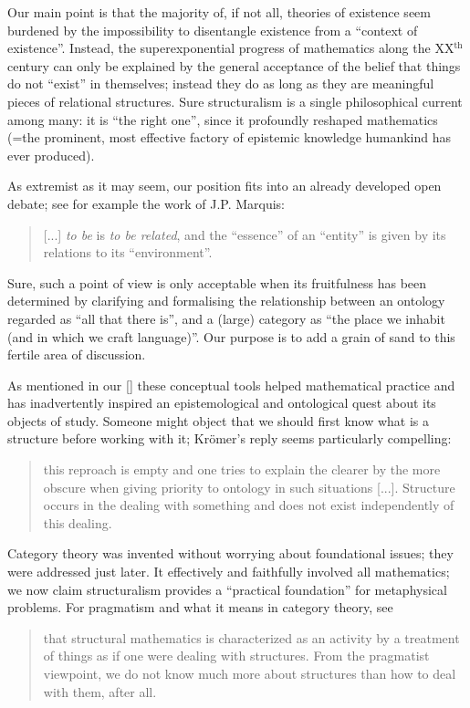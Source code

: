 \begin{itemize}
\end{itemize}
Our main point is that the majority of, if not all, theories of existence seem burdened by the impossibility to disentangle existence from a ``context of existence''. Instead, the superexponential progress of mathematics along the XX$^\text{th}$ century can only be explained by the general acceptance of the belief that things do not ``exist'' in themselves; instead they do as long as they are meaningful pieces of relational structures. Sure structuralism is a single philosophical current among many: it is ``the right one'', since it profoundly reshaped mathematics (=the prominent, most effective factory of epistemic knowledge humankind has ever produced).

As extremist as it may seem, our position fits into an already developed open debate; see for example the work of J.P. Marquis:
\begin{quote}
	[...] \emph{to be} is \emph{to be related}, and the ``essence'' of an ``entity'' is given by its relations to its ``environment''.
	\hfill \cite{Marquis1997}
\end{quote}
Sure, such a point of view is only acceptable when its fruitfulness has been determined by clarifying and formalising the relationship between an ontology regarded as ``all that there is'', and a (large) category as ``the place we inhabit (and in which we craft language)''. Our purpose is to add a grain of sand to this fertile area of discussion.

As mentioned in our \autoref{} these conceptual tools helped mathematical practice and has inadvertently inspired an epistemological and ontological quest about its objects of study. Someone might object that we should first know what is a structure before working with it; Kr\"omer's reply seems particularly compelling:
\begin{quote}
	this reproach is empty and one tries to explain the clearer by the more obscure when giving priority to ontology in such situations [...]. Structure occurs in the dealing with something and does
	not exist independently of this dealing. \cite{kromer2007tool}
\end{quote}
Category theory was invented without worrying about foundational issues; they were addressed just later. It effectively and faithfully involved all mathematics; we now claim structuralism provides a ``practical foundation'' for metaphysical problems. For pragmatism and what it means in category theory, see
\begin{quote}
	that structural mathematics is characterized as an activity by a treatment of things as if one were dealing with structures. From the pragmatist viewpoint, we do not know much more about structures than how to deal with them, after all. \hfill \cite{kromer2007tool}
\end{quote}